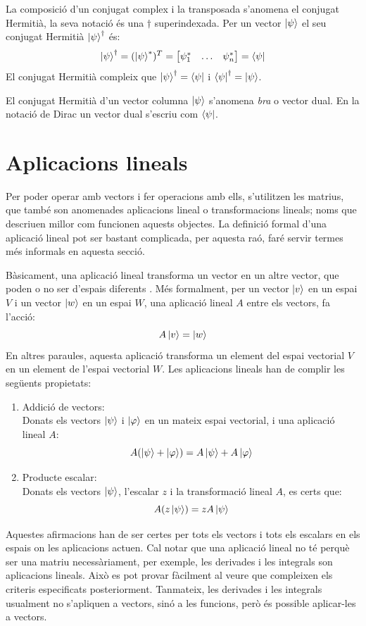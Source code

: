 La composició d'un conjugat complex i la transposada s'anomena el conjugat Hermitià, la seva notació és una $\dagger$ superindexada. Per un vector $\ket{\psi}$ el seu conjugat Hermitià $\ket{\psi}^\dagger$ és:
$$
\ket{\psi}^\dagger = (\ket{\psi}^*)^T =  \begin{bmatrix} \psi_{1}^* & \dots & \psi_{n}^* \end{bmatrix} = \bra{\psi}
$$
El conjugat Hermitià compleix que $\ket{\psi}^\dagger = \bra{\psi}$ i $\bra{\psi}^\dagger = \ket{\psi}$.

El conjugat Hermitià d'un vector columna $\ket{\psi}$ s'anomena \textit{bra} o vector dual. En la notació de Dirac un vector dual s'escriu com $\bra{\psi}$.

\section{Aplicacions lineals}
Per poder operar amb vectors i fer operacions amb ells, s'utilitzen les matrius, que també son anomenades aplicacions lineal o transformacions lineals; noms que descriuen millor com funcionen aquests objectes. La definició formal d'una aplicació lineal pot ser bastant complicada, per aquesta raó, faré servir termes més informals en aquesta secció. 

Bàsicament, una aplicació lineal transforma un vector en un altre vector, que poden o no ser d'espais diferents \cite{LR_done_right:linear_map}. Més formalment, per un vector $\ket{v}$ en un espai $V$ i un vector $\ket{w}$ en un espai $W$, una aplicació lineal $A$ entre els vectors, fa l'acció:
$$
A \ket{v} = \ket{w}
$$
En altres paraules, aquesta aplicació transforma un element del espai vectorial $V$ en un element de l'espai vectorial $W$.
Les aplicacions lineals han de complir les següents propietats:
\begin{enumerate}
	\item Addició de vectors: \\
	Donats els vectors $\ket{\psi}$ i $\ket{\varphi}$ en un mateix espai vectorial, i una aplicació lineal $A$:
	$$ A(\ket{\psi} + \ket{\varphi}) = A\ket{\psi} + A\ket{\varphi}$$ 
	\item Producte escalar:\\
	Donats els vectors $\ket{\psi}$, l'escalar $z$ i la transformació lineal $A$, es certs que:
	$$ A(z\ket{\psi}) = z A \ket{\psi}$$
\end{enumerate}

Aquestes afirmacions han de ser certes per tots els vectors i tots els escalars en els espais on les aplicacions actuen. Cal notar que una aplicació lineal no té perquè ser una matriu necessàriament, per exemple, les derivades i les integrals son aplicacions lineals. Això es pot provar fàcilment al veure que compleixen els criteris especificats posteriorment. Tanmateix, les derivades i les integrals usualment no s'apliquen a vectors, sinó a les funcions, però és possible aplicar-les a vectors.

